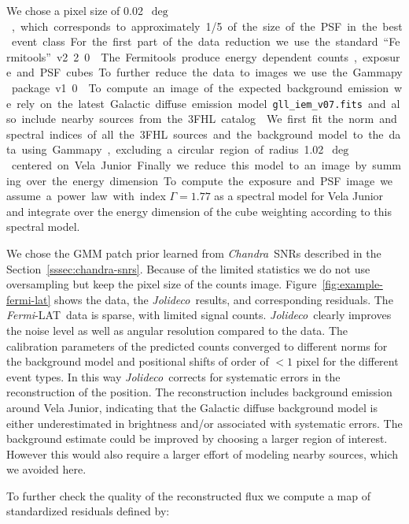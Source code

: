 \documentclass[twocolumn, lineno]{aastex631}
\newcommand{\chandra}{\textit{Chandra}~}
\newcommand{\fermi}{\textit{Fermi}-LAT~}
\newcommand{\jolideco}{\textit{Jolideco}~}
\begin{document}
     We chose a pixel size of \qty[mode = text]{0.02}{$\deg$}, which corresponds to approximately 1/5 of the size of the PSF in the best event class. For the first part of the data reduction we use the standard \enquote{Fermitools} v2.2.0 \citep{Fermitools2019}.
    
    The Fermitools produce energy dependent counts, exposure and PSF cubes. To further reduce the data to images we use the Gammapy package v1.0 \citep{GammapyZenodov1.0.1, Gammapy2023}. To compute an image of the expected background emission we rely on the latest Galactic diffuse emission model \texttt{gll\_iem\_v07.fits} and also include nearby sources from the 3FHL catalog \citep{Ajello2017}. We first fit the norm and spectral indices of all the 3FHL sources and the background model to the data using Gammapy, excluding a circular region of radius \qty[mode = text]{1.02}{$\deg$} centered on Vela Junior. Finally we reduce this model to an image by summing over the energy dimension. To compute the exposure and PSF image we assume a power law with index $\Gamma=1.77$ \citep{Ajello2017} as a spectral model for Vela Junior and integrate over the energy dimension of the cube weighting according to this spectral model.
    
    We chose the GMM patch prior learned from \chandra SNRs described in the Section~\ref{sssec:chandra-snrs}. Because of the limited statistics we do not use oversampling but keep the pixel size of the counts image. Figure~\ref{fig:example-fermi-lat} shows the data,  the \jolideco results, and corresponding residuals. The \fermi data is sparse, with limited signal counts. \jolideco clearly improves the noise level as well as angular resolution compared to the data. The calibration parameters of the predicted counts converged to different norms for the background model and positional shifts of order of $<1$ pixel for the different event types. In this way \jolideco corrects for systematic errors in the reconstruction of the position. The reconstruction includes background emission around Vela Junior, indicating that the Galactic diffuse background model is either underestimated in brightness and/or associated with systematic errors. The background estimate could be improved by choosing a larger region of interest. However this would also require a larger effort of modeling nearby sources, which we avoided here.
    
    To further check the quality of the reconstructed flux we compute a map of standardized residuals defined by:
\end{document}
